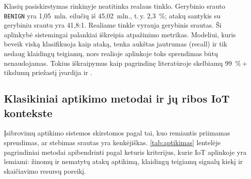 Klasių pasiskirstymas rinkinyje neatitinka realaus
tinklo. Gerybinio srauto \texttt{BENIGN} yra 1{,}05~mln. eilučių iš
45{,}02~mln., t.\,y. 2{,}3~\%; atakų santykis su gerybiniu
srautu yra 41{,}8:1. Realiame tinkle vyrauja gerybinis srautas. Ši aplinkybė
sistemingai palankiai iškreipia atpažinimo metrikas. Modeliui, kuris
beveik viską klasifikuoja kaip ataką, tenka aukštas jautrumas
(recall) ir tik nedaug klaidingų teigiamų, nors realioje
aplinkoje toks sprendimas būtų nenaudojamas. Tokius iškraipymus
kaip pagrindinę literatūroje skelbiamų 99~\%\,+ tikslumų priežastį
įvardija ir \citeauthor{reddy2026datasets}
\cite{reddy2026datasets}.

\subsection{Klasikiniai aptikimo metodai ir jų ribos IoT kontekste}
\label{sec:klasikiniai}

Įsibrovimų aptikimo sistemos skirstomos pagal tai, kuo remiantis priimamas sprendimas, ar
stebimas srautas yra kenkėjiškas. \ref{tab:aptikimas} lentelėje pagrindiniai
metodai apibendrinti pagal keturis kriterijus, kurie IoT aplinkoje yra
lemiami: žinomų ir nematytų atakų aptikimą, klaidingų teigiamų signalų
kiekį ir skaičiavimo resursų poreikį.

